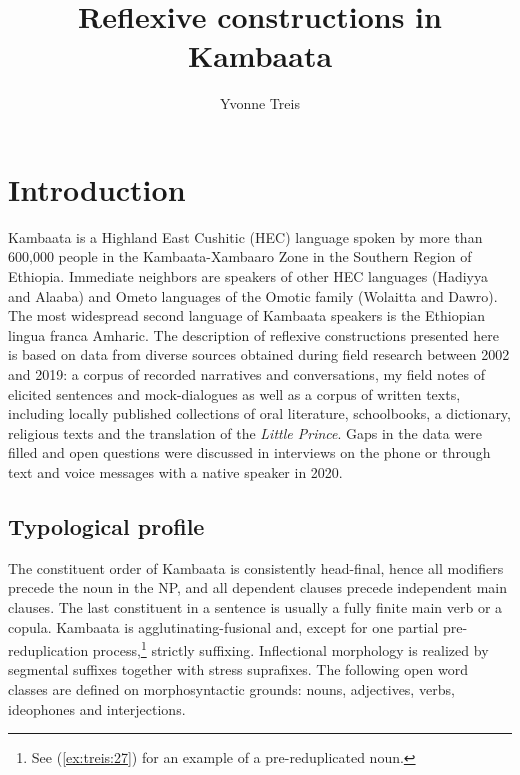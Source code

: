 \documentclass[output=paper]{langscibook}
\title{Reflexive constructions in Kambaata}
\author{Yvonne Treis\affiliation{LLACAN (CNRS, INALCO)}\orcid{}}
\begin{document}
\maketitle

\section{Introduction}\label{sec:treis:1}
Kambaata is a Highland East Cushitic (HEC) language spoken by more than 600,000 people \citep[74]{CSA2007} in the Kambaata-Xambaaro Zone in the Southern Region of Ethiopia. Immediate neighbors are speakers of other HEC languages (Hadiyya and Alaaba) and Ometo languages of the Omotic family (Wolaitta and Dawro). The most widespread second language of Kambaata speakers is the Ethiopian lingua franca Amharic. The description of reflexive constructions presented here is based on data from diverse sources obtained during field research between 2002 and 2019: a corpus of recorded narratives and conversations, my field notes of elicited sentences and mock-dialogues as well as a corpus of written texts, including locally published collections of oral literature, schoolbooks, a dictionary, religious texts and the translation of the \textit{Little Prince}. Gaps in the data were filled and open questions were discussed in interviews on the phone or through text and voice messages with a native speaker in 2020.

\subsection{Typological profile}\label{sec:treis:1.1}

The constituent order of Kambaata is consistently head-final, hence all modifiers precede the noun in the NP, and all dependent clauses precede independent main clauses. The last constituent in a sentence is usually a fully finite main verb or a copula. Kambaata is agglutinating-fusional and, except for one partial pre-reduplication process,\footnote{See (\ref{ex:treis:27}) for an example of a pre-reduplicated noun.} strictly suffixing. Inflectional morphology is realized by segmental suffixes together with stress suprafixes. The following open word classes are defined on morphosyntactic grounds: nouns, adjectives, verbs, ideophones and interjections. 
\end{document}

